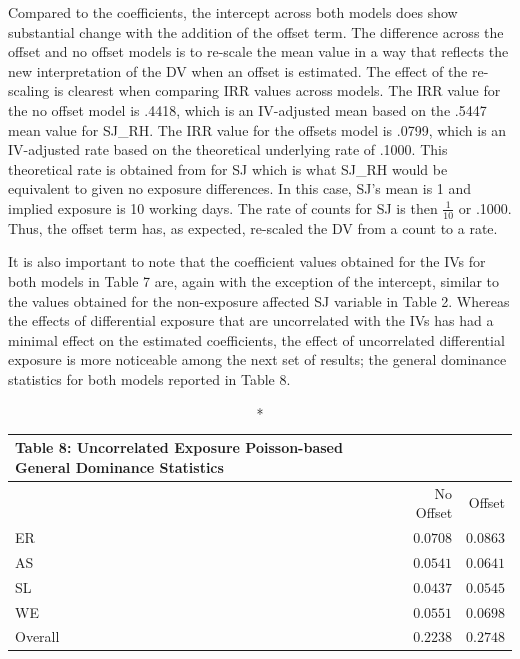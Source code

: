 \documentclass[ShortAfour,times,sageapa]{sagej}
\begin{document}
	Compared to the coefficients, the intercept across both models does show substantial change with the addition of the offset term.
	The difference across the offset and no offset models is to re-scale the mean value in a way that reflects the new interpretation of the DV when an offset is estimated.
	The effect of the re-scaling is clearest when comparing IRR values across models.
	The IRR value for the no offset model is .4418, which is an IV-adjusted mean based on the .5447 mean value for SJ\_RH.
	The IRR value for the offsets model is .0799, which is an IV-adjusted rate based on the theoretical underlying rate of .1000.
	This theoretical rate is obtained from for SJ which is what SJ\_RH would be equivalent to given no exposure differences.
	In this case, SJ's mean is 1 and implied exposure is 10 working days.
	The rate of counts for SJ is then $\frac{1}{10}$ or .1000.
	Thus, the offset term has, as expected, re-scaled the DV from a count to a rate.
	
	It is also important to note that the coefficient values obtained for the IVs for both models in Table 7 are, again with the exception of the intercept, similar to the values obtained for the non-exposure affected SJ variable in Table 2.
	Whereas the effects of differential exposure that are uncorrelated with the IVs has had a minimal effect on the estimated coefficients, the effect of uncorrelated differential exposure is more noticeable among the next set of results; the general dominance statistics for both models reported in Table 8.
	
	\begin{longtable}{l|rr}
		\caption*{
			{\large Table 8: Uncorrelated Exposure Poisson-based General Dominance Statistics}
		} \\ 
		\toprule
		\multicolumn{1}{l}{} & No Offset & Offset \\ 
		\midrule
		ER & $0.0708$ & $0.0863$ \\ 
		AS & $0.0541$ & $0.0641$ \\ 
		SL & $0.0437$ & $0.0545$ \\ 
		WE & $0.0551$ & $0.0698$ \\ 
		\midrule
		Overall & $0.2238$ & $0.2748$ \\ 
		\bottomrule
	\end{longtable}
	
\end{document}
